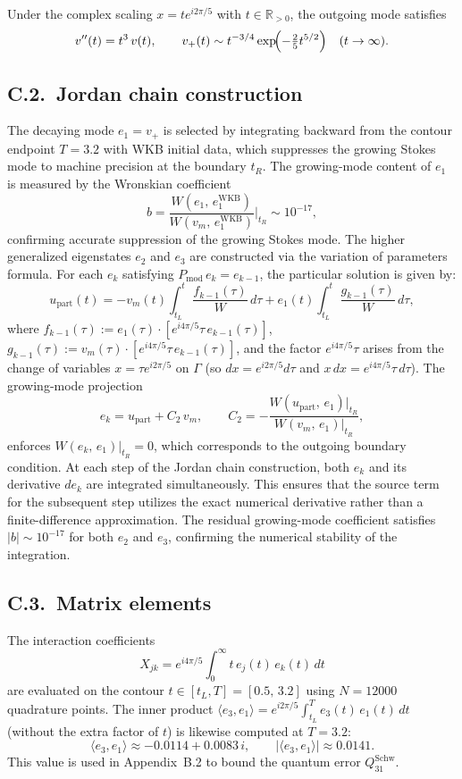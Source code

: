 \documentclass[12pt,a4paper]{amsart}
\theoremstyle{remark}
\begin{document}
Under the complex scaling $x = te^{i2\pi/5}$ with $t \in \mathbb{R}_{>0}$, the outgoing mode satisfies
\[
  v''(t) = t^3\,v(t),
  \qquad
  v_+(t) \sim t^{-3/4}\exp\!\Bigl(-\tfrac{2}{5}t^{5/2}\Bigr) \quad (t \to \infty).
\]

\subsection*{C.2.~Jordan chain construction}

The decaying mode $e_1 = v_+$ is selected by integrating backward from
the contour endpoint $T = 3.2$ with WKB initial data, which suppresses the growing Stokes
mode to machine precision at the boundary $t_R$.
The growing-mode content of $e_1$ is measured by the Wronskian coefficient
\[
  b = \frac{W(e_1,\, e_1^{\mathrm{WKB}})}{W(v_m,\, e_1^{\mathrm{WKB}})}\bigg|_{t_R}
  \sim 10^{-17},
\]
confirming accurate suppression of the growing Stokes mode.
The higher generalized eigenstates $e_2$ and $e_3$ are constructed via the variation of
parameters formula. For each $e_k$ satisfying $P_{\mathrm{mod}}\,e_k = e_{k-1}$,
the particular solution is given by:
\[
  u_{\mathrm{part}}(t) = -v_m(t) \int_{t_L}^{t} \frac{f_{k-1}(\tau)}{W}\,d\tau
                        + e_1(t)  \int_{t_L}^{t} \frac{g_{k-1}(\tau)}{W}\,d\tau,
\]
where $f_{k-1}(\tau) := e_1(\tau)\cdot[e^{i4\pi/5}\tau\, e_{k-1}(\tau)]$,
$g_{k-1}(\tau) := v_m(\tau)\cdot[e^{i4\pi/5}\tau\, e_{k-1}(\tau)]$,
and the factor $e^{i4\pi/5}\tau$ arises from the change of variables
$x = \tau e^{i2\pi/5}$ on $\Gamma$ (so $dx = e^{i2\pi/5}d\tau$ and
$x\,dx = e^{i4\pi/5}\tau\,d\tau$).
The growing-mode projection
\[
  e_k = u_{\mathrm{part}} + C_2\,v_m,
  \qquad
  C_2 = -\frac{W(u_{\mathrm{part}},\, e_1)\big|_{t_R}}{W(v_m,\, e_1)\big|_{t_R}},
\]
enforces $W(e_k,\, e_1)\big|_{t_R} = 0$, which corresponds to the outgoing boundary condition.
At each step of the Jordan chain construction, both $e_k$ and its derivative $de_k$ are integrated
simultaneously. This ensures that the source term for the subsequent step utilizes the
exact numerical derivative rather than a finite-difference approximation.
The residual growing-mode coefficient satisfies $|b| \sim 10^{-17}$
for both $e_2$ and $e_3$, confirming the numerical stability of the integration.

\subsection*{C.3.~Matrix elements}

The interaction coefficients
\[
  X_{jk} = e^{i4\pi/5}\int_0^{\infty} t\,e_j(t)\,e_k(t)\,dt
\]
are evaluated on the contour $t \in [t_L, T] = [0.5,\, 3.2]$
using $N = 12000$ quadrature points.
The inner product
$\langle e_3, e_1\rangle = e^{i2\pi/5}\int_{t_L}^T e_3(t)\,e_1(t)\,dt$
(without the extra factor of $t$) is likewise computed at $T=3.2$:
\[
  \langle e_3, e_1\rangle \approx -0.0114 + 0.0083\,i,
  \qquad |\langle e_3, e_1\rangle| \approx 0.0141.
\]
This value is used in Appendix~B.2 to bound the quantum error $Q^{\mathrm{Schw}}_{31}$.
\end{document}
